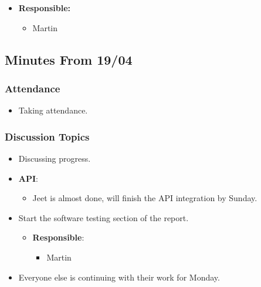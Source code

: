 \documentclass[11pt]{article}
\begin{document}
\begin{enumerate}
  \begin{itemize}
  \tightlist
  \item
    \textbf{Responsible:}

    \begin{itemize}
    \tightlist
    \item
      Martin
    \end{itemize}
  \end{itemize}
\end{enumerate}

\hypertarget{minutes-from-1904}{%
\subsection{Minutes From 19/04}\label{minutes-from-1904}}

\hypertarget{attendance-4}{%
\subsubsection{Attendance}\label{attendance-4}}

\begin{itemize}
\tightlist
\item
  Taking attendance.
\end{itemize}

\hypertarget{discussion-topics-3}{%
\subsubsection{Discussion Topics}\label{discussion-topics-3}}

\begin{itemize}
\tightlist
\item
  Discussing progress.
\item
  \textbf{API}:

  \begin{itemize}
  \tightlist
  \item
    Jeet is almost done, will finish the API integration by Sunday.
  \end{itemize}
\item
  Start the software testing section of the report.

  \begin{itemize}
  \tightlist
  \item
    \textbf{Responsible}:

    \begin{itemize}
    \tightlist
    \item
      Martin
    \end{itemize}
  \end{itemize}
\item
  Everyone else is continuing with their work for Monday.
\end{itemize}
\end{document}
